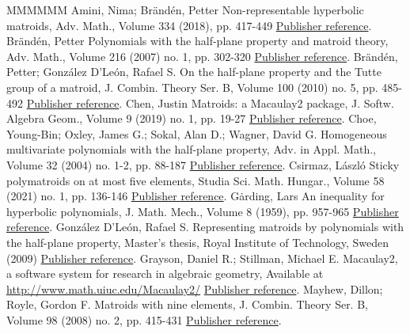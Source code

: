\documentclass[11pt]{article}
\theoremstyle{definition}
\numberwithin{equation}{section}
\begin{document}
\begin{thebibliography}{MMMMMM}
 Amini, Nima; Brändén, Petter Non-representable hyperbolic matroids, Adv. Math., Volume 334 (2018), pp. 417-449 \href{https://alco.centre-mersenne.org/articles/10.5802/alco.399/#NonPappus}{Publisher reference}.
 Brändén, Petter Polynomials with the half-plane property and matroid theory, Adv. Math., Volume 216 (2007) no. 1, pp. 302-320 \href{https://alco.centre-mersenne.org/articles/10.5802/alco.399/#BrandenHPP}{Publisher reference}.
 Brändén, Petter; González D’León, Rafael S. On the half-plane property and the Tutte group of a matroid, J. Combin. Theory Ser. B, Volume 100 (2010) no. 5, pp. 485-492 \href{https://alco.centre-mersenne.org/articles/10.5802/alco.399/#BrandenDLeon}{Publisher reference}.
 Chen, Justin Matroids: a Macaulay2 package, J. Softw. Algebra Geom., Volume 9 (2019) no. 1, pp. 19-27 \href{https://alco.centre-mersenne.org/articles/10.5802/alco.399/#MatroidsArticle}{Publisher reference}.
 Choe, Young-Bin; Oxley, James G.; Sokal, Alan D.; Wagner, David G. Homogeneous multivariate polynomials with the half-plane property, Adv. in Appl. Math., Volume 32 (2004) no. 1-2, pp. 88-187 \href{https://alco.centre-mersenne.org/articles/10.5802/alco.399/#HPPlong}{Publisher reference}.
 Csirmaz, László Sticky polymatroids on at most five elements, Studia Sci. Math. Hungar., Volume 58 (2021) no. 1, pp. 136-146 \href{https://alco.centre-mersenne.org/articles/10.5802/alco.399/#stickypolymatroids}{Publisher reference}.
 Gȧrding, Lars An inequality for hyperbolic polynomials, J. Math. Mech., Volume 8 (1959), pp. 957-965 \href{https://alco.centre-mersenne.org/articles/10.5802/alco.399/#gar}{Publisher reference}.
 González D’León, Rafael S. Representing matroids by polynomials with the half-plane property, Master’s thesis, Royal Institute of Technology, Sweden (2009) \href{https://alco.centre-mersenne.org/articles/10.5802/alco.399/#masterleon}{Publisher reference}.
 Grayson, Daniel R.; Stillman, Michael E. Macaulay2, a software system for research in algebraic geometry, Available at \url{http://www.math.uiuc.edu/Macaulay2/} \href{https://alco.centre-mersenne.org/articles/10.5802/alco.399/#M2}{Publisher reference}.
 Mayhew, Dillon; Royle, Gordon F. Matroids with nine elements, J. Combin. Theory Ser. B, Volume 98 (2008) no. 2, pp. 415-431 \href{https://alco.centre-mersenne.org/articles/10.5802/alco.399/#ninematroids}{Publisher reference}.

\end{thebibliography}
\end{document}
